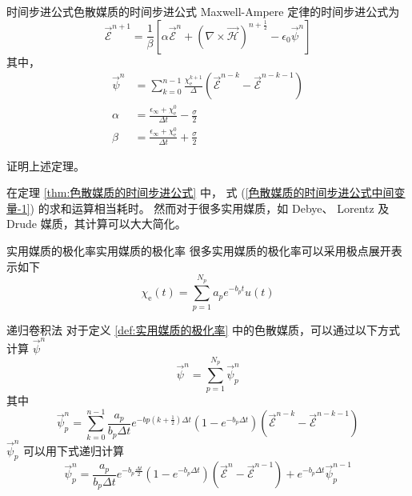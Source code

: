 \begin{theorem}{时间步进公式}{色散媒质的时间步进公式}
    Maxwell-Ampere 定律的时间步进公式为
    \begin{equation}
        \vec{\mathscr{E}}^{n+1}=
        \frac{1}{\beta}\left[
            \alpha \vec{\mathscr{E}}^{n}
            +(\nabla \times \vec{\mathscr{H}})^{n+\frac{1}{2}}
            -\epsilon_0 \vec{\psi}^{n}
        \right]
    \end{equation}
    其中，
    \begin{align}
        \label{色散媒质的时间步进公式中间变量-1}
        \vec{\psi}^{n}&=\sum_{k=0}^{n-1}
        \frac{\chi_{\text{e}}^{k+1}}{\Delta}
        (\vec{\mathscr{E}}^{n-k}-\vec{\mathscr{E}}^{n-k-1})\\
        \alpha&=\frac{\epsilon_{\infty}+\chi_{\text{e}}^0}{\Delta t}-\frac{\sigma}{2}\\
        \beta&=\frac{\epsilon_{\infty}+\chi_{\text{e}}^0}{\Delta t}+\frac{\sigma}{2}
    \end{align}
\end{theorem}

\begin{exercise}
    证明上述定理。
\end{exercise}

\par 在定理 \ref{thm:色散媒质的时间步进公式} 中，
式 (\ref{色散媒质的时间步进公式中间变量-1}) 的求和运算相当耗时。
然而对于很多实用媒质，如 Debye、
Lorentz 及 Drude 媒质，其计算可以大大简化。

\begin{definition}{实用媒质的极化率}{实用媒质的极化率}
    很多实用媒质的极化率可以采用极点展开表示如下
    \begin{equation}
        \chi_{\text{e}}(t)=\sum_{p=1}^{N_p}
        a_p e^{-b_p t}u(t)
        \label{实用媒质的极化率}
    \end{equation}
\end{definition}

\begin{theorem}{递归卷积法}
    对于定义 \ref{def:实用媒质的极化率} 中的色散媒质，可以通过以下方式
    计算 $\vec{\psi}^{n}$
    \begin{equation}
        \vec{\psi}^{n}=\sum_{p=1}^{N_p}
        \vec{\psi}_p^{n}
    \end{equation}
    其中
    \begin{equation}
        \vec{\psi}_p^{n}=\sum_{k=0}^{n-1}
        \frac{a_p}{b_p\Delta t}
        e^{-bp\left(k+\frac{1}{2}\right)\Delta t}
        (1-e^{-b_p\Delta t})
        (\vec{\mathscr{E}}^{n-k}-\vec{\mathscr{E}}^{n-k-1})
    \end{equation}
    $\vec{\psi}_p^{n}$ 可以用下式递归计算
    \begin{equation}
        \vec{\psi}_p^{n}=\frac{a_p}{b_p\Delta t}
        e^{-b_p\frac{\Delta t}{2}}(1-e^{-b_p\Delta t})
        (\vec{\mathscr{E}}^{n}-\vec{\mathscr{E}}^{n-1})
        +e^{-b_p\Delta t}\vec{\psi}_p^{n-1}
    \end{equation}
\end{theorem}

